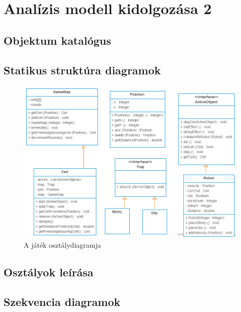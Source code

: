 %
\chapter{Analízis modell kidolgozása 2}

\thispagestyle{fancy}

\section{Objektum katalógus}


\clearpage
\section{Statikus struktúra diagramok}

\begin{figure}[!htbp]
\begin{center}
\includegraphics[width=15cm]{./vegleges_statikus_seq/static_structure.png}
\caption{A játék osztálydiagramja}
\end{center}
\end{figure}


\section{Osztályok leírása}


\clearpage
\section{Szekvencia diagramok}


